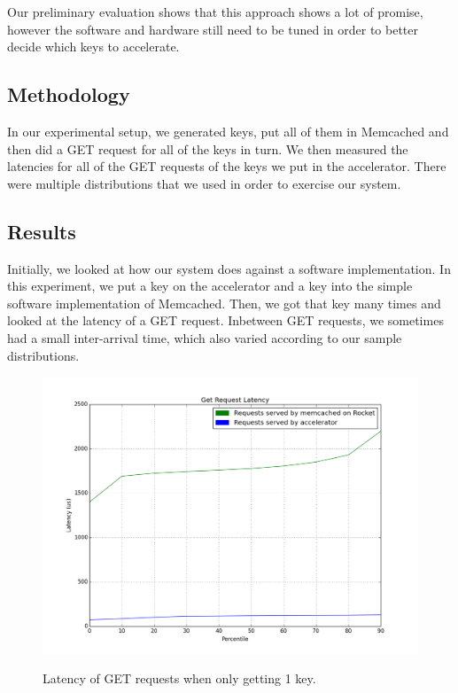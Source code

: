Our preliminary evaluation shows that this approach shows a lot of promise,
however the software and hardware still need to be tuned in order to better
decide which keys to accelerate.

\subsection{Methodology}

In our experimental setup, we generated keys, put all of them in Memcached and
then did a GET request for all of the keys in turn. We then measured the
latencies for all of the GET requests of the keys we put in the accelerator.
There were multiple distributions that we used in order to exercise our system.


\subsection{Results}

Initially, we looked at how our system does against a software implementation.
In this experiment, we put a key on the accelerator and a key into the simple
software implementation of Memcached. Then, we got that key many times and
looked at the latency of a GET request. Inbetween GET requests, we sometimes
had a small inter-arrival time, which also varied according to our sample
distributions.


\begin{figure}[t]
\begin{center}
\label{fig:one-req}
\includegraphics[width=\linewidth]{graph.png}
\caption{Latency of GET requests when only getting 1 key.}
\end{center}
\end{figure}

